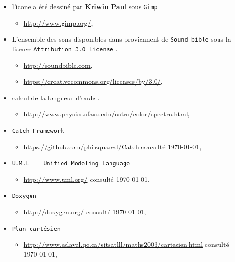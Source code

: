\documentclass[a4paper,11pt]{report}
\begin{document}
\begin{itemize}
	\item[] l'icone a été dessiné par \href{mailto:39171@heb.be}{\textbf{Kriwin Paul}} sous
		\texttt{Gimp}
		\begin{itemize}
			\item \url{http://www.gimp.org/}, \\
		\end{itemize}
	\item[] L'ensemble des sons disponibles dans 
		proviennent de \texttt{Sound bible}  sous la license 
		\texttt{Attribution 3.0 License} :
		\begin{itemize}
			\item \url{http://soundbible.com},
			\item \url{https://creativecommons.org/licenses/by/3.0/},\\
		\end{itemize}
	\item[] calcul de la longueur d'onde :
		\begin{itemize}
			\item \url{http://www.physics.sfasu.edu/astro/color/spectra.html},\\
		\end{itemize}
	\item[] \texttt{Catch Framework} 
		\begin{itemize}
			\item \url{https://github.com/philsquared/Catch} consulté \today,\\
		\end{itemize}
	\item[] \texttt{U.M.L. - Unified Modeling Language} 
		\begin{itemize}
			\item \url{http://www.uml.org/} consulté \today,\\
		\end{itemize}
	\item[] \texttt{Doxygen} 
		\begin{itemize}
			\item \url{http://doxygen.org/} consulté \today,\\
		\end{itemize}
	\item[] \texttt{Plan cartésien} 
		\begin{itemize}
			\item \url{http://www.cslaval.qc.ca/sitsatlll/maths2003/cartesien.html} consulté \today,\\

\end{itemize}
\end{itemize}
\end{document}
